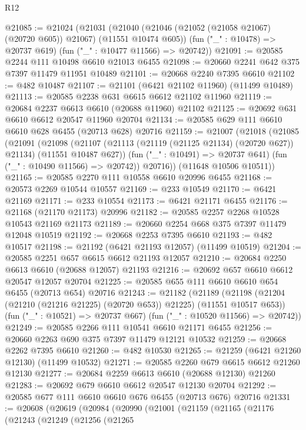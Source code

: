 \begin{lexlean}{R12}
\begin{coremodule}
{{{{{{{{{{{{{{{{{{{{{{{{{{{{{{{{{{{{{{{{{{{{{{{{{{{{{{{{{{{{{{{{{{{{{{{{{{{{{{{{{{@21085 := @21024
    (@21031
      (@21040 (@21046 (@21052 (@21058 @21067) (@20720 @605)) @21067) (@11551 @10474 @605))
      (fun ("_" : @10478) => @20737 @619)
      (fun ("_" : @10477 @11566) => @20742))
@21091 := @20585 @2244 @111 @10498 @6610 @21013 @6455
@21098 := @20660 @2241 @642 @375 @7397 @11479 @11951 @10489
@21101 := @20668 @2240 @7395 @6610
@21102 := @482 @10487
@21107 := @21101 (@6421 @21102 @11960) (@11499 @10489)
@21113 := @20585 @2238 @631 @6615 @6612 @21102 @11960
@21119 := @20684 @2237 @6613 @6610 (@20688 @11960) @21102
@21125 := @20692 @631 @6610 @6612 @20547 @11960 @20704
@21134 := @20585 @629 @111 @6610 @6610 @628 @6455 (@20713 @628) @20716
@21159 := @21007
    (@21018
      (@21085
        (@21091
          (@21098
            (@21107 (@21113 (@21119 (@21125 @21134) (@20720 @627)) @21134) (@11551 @10487 @627))
            (fun ("_" : @10491) => @20737 @641)
            (fun ("_" : @10490 @11566) => @20742))
          @20716))
      (@11648 @10506 @10511))
@21165 := @20585 @2270 @111 @10558 @6610 @20996 @6455
@21168 := @20573 @2269 @10544 @10557
@21169 := @233 @10549
@21170 := @6421 @21169
@21171 := @233 @10554
@21173 := @6421 @21171 @6455
@21176 := @21168 (@21170 @21173) @20996
@21182 := @20585 @2257 @2268 @10528 @10543 @21169 @21173
@21189 := @20660 @2254 @668 @375 @7397 @11479 @12048 @10519
@21192 := @20668 @2253 @7395 @6610
@21193 := @482 @10517
@21198 := @21192 (@6421 @21193 @12057) (@11499 @10519)
@21204 := @20585 @2251 @657 @6615 @6612 @21193 @12057
@21210 := @20684 @2250 @6613 @6610 (@20688 @12057) @21193
@21216 := @20692 @657 @6610 @6612 @20547 @12057 @20704
@21225 := @20585 @655 @111 @6610 @6610 @654 @6455 (@20713 @654) @20716
@21243 := @21182
    (@21189
      (@21198 (@21204 (@21210 (@21216 @21225) (@20720 @653)) @21225) (@11551 @10517 @653))
      (fun ("_" : @10521) => @20737 @667)
      (fun ("_" : @10520 @11566) => @20742))
@21249 := @20585 @2266 @111 @10541 @6610 @21171 @6455
@21256 := @20660 @2263 @690 @375 @7397 @11479 @12121 @10532
@21259 := @20668 @2262 @7395 @6610
@21260 := @482 @10530
@21265 := @21259 (@6421 @21260 @12130) (@11499 @10532)
@21271 := @20585 @2260 @679 @6615 @6612 @21260 @12130
@21277 := @20684 @2259 @6613 @6610 (@20688 @12130) @21260
@21283 := @20692 @679 @6610 @6612 @20547 @12130 @20704
@21292 := @20585 @677 @111 @6610 @6610 @676 @6455 (@20713 @676) @20716
@21331 := @20608
    (@20619
      (@20984
        (@20990
          (@21001
            (@21159
              (@21165
                (@21176
                  (@21243
                    (@21249
                      (@21256
                        (@21265
}}}}}}}}}}}}}}}}}}}}}}}}}}}}}}}}}}}}}}}}}}}}}}}}}}}}}}}}}}}}}}}}}}}}}}}}}}}}}}}}}}
\end{coremodule}
\end{lexlean}
